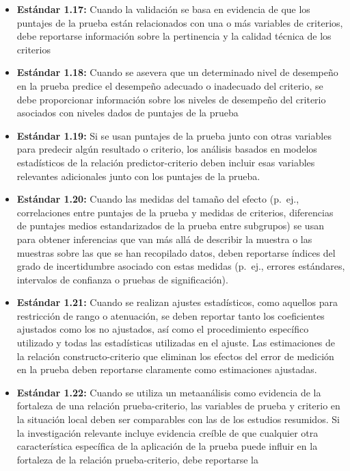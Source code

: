 \documentclass[
  letterpaper,
  DIV=11,
  numbers=noendperiod]{scrreprt}
\providecommand{\tightlist}{%
  \setlength{\itemsep}{0pt}\setlength{\parskip}{0pt}}
\begin{document}
\begin{itemize}
\tightlist
\item
  \textbf{Estándar 1.17:} Cuando la validación se basa en evidencia de
  que los puntajes de la prueba están relacionados con una o más
  variables de criterios, debe reportarse información sobre la
  pertinencia y la calidad técnica de los criterios
\item
  \textbf{Estándar 1.18:} Cuando se asevera que un determinado nivel de
  desempeño en la prueba predice el desempeño adecuado o inadecuado del
  criterio, se debe proporcionar información sobre los niveles de
  desempeño del criterio asociados con niveles dados de puntajes de la
  prueba
\item
  \textbf{Estándar 1.19:} Si se usan puntajes de la prueba junto con
  otras variables para predecir algún resultado o criterio, los análisis
  basados en modelos estadísticos de la relación predictor-criterio
  deben incluir esas variables relevantes adicionales junto con los
  puntajes de la prueba.
\item
  \textbf{Estándar 1.20:} Cuando las medidas del tamaño del efecto
  (p.~ej., correlaciones entre puntajes de la prueba y medidas de
  criterios, diferencias de puntajes medios estandarizados de la prueba
  entre subgrupos) se usan para obtener inferencias que van más allá de
  describir la muestra o las muestras sobre las que se han recopilado
  datos, deben reportarse índices del grado de incertidumbre asociado
  con estas medidas (p.~ej., errores estándares, intervalos de confianza
  o pruebas de significación).
\item
  \textbf{Estándar 1.21:} Cuando se realizan ajustes estadísticos, como
  aquellos para restricción de rango o atenuación, se deben reportar
  tanto los coeficientes ajustados como los no ajustados, así como el
  procedimiento específico utilizado y todas las estadísticas utilizadas
  en el ajuste. Las estimaciones de la relación constructo-criterio que
  eliminan los efectos del error de medición en la prueba deben
  reportarse claramente como estimaciones ajustadas.
\item
  \textbf{Estándar 1.22:} Cuando se utiliza un metaanálisis como
  evidencia de la fortaleza de una relación prueba-criterio, las
  variables de prueba y criterio en la situación local deben ser
  comparables con las de los estudios resumidos. Si la investigación
  relevante incluye evidencia creíble de que cualquier otra
  característica específica de la aplicación de la prueba puede influir
  en la fortaleza de la relación prueba-criterio, debe reportarse la

\end{itemize}
\end{document}
